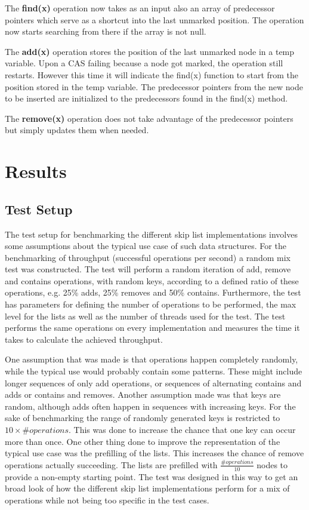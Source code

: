 \documentclass{article}
\begin{document}
\noindent
The \textbf{find(x)} operation now takes as an input also an array of predecessor pointers which serve as a shortcut into the last unmarked position. The operation now starts searching from there if the array is not null.  \medskip 

\noindent
The \textbf{add(x)} operation stores the position of the last unmarked node in a temp variable. Upon a CAS failing because a node got marked, the operation still restarts. However this time it will indicate the find(x) function to start from the position stored in the temp variable. The predecessor pointers from the new node to be inserted are initialized to the predecessors found in the find(x) method. \medskip

\noindent
The \textbf{remove(x)} operation does not take advantage of the predecessor pointers but simply updates them when needed.



\section{Results}
\subsection{Test Setup}
The test setup for benchmarking the different skip list implementations involves some assumptions about the typical use case of such data structures.
For the benchmarking of throughput (successful operations per second) a random mix test was constructed.
The test will perform a random iteration of add, remove and contains operations, with random keys, according to a defined ratio of these operations, e.g. 25\% adds, 25\% removes and 50\% contains.
Furthermore, the test has parameters for defining the number of operations to be performed, the max level for the lists as well as the number of threads used for the test.
The test performs the same operations on every implementation and measures the time it takes to calculate the achieved throughput.

One assumption that was made is that operations happen completely randomly, while the typical use would probably contain some patterns.
These might include longer sequences of only add operations, or sequences of alternating contains and adds or contains and removes.
Another assumption made was that keys are random, although adds often happen in sequences with increasing keys.
For the sake of benchmarking the range of randomly generated keys is restricted to $10\times\#operations$.
This was done to increase the chance that one key can occur more than once.
One other thing done to improve the representation of the typical use case was the prefilling of the lists.
This increases the chance of remove operations actually succeeding.
The lists are prefilled with $\frac{\#operations}{10}$ nodes to provide a non-empty starting point.
The test was designed in this way to get an broad look of how the different skip list implementations perform for a mix of operations while not being too specific in the test cases.
\end{document}
